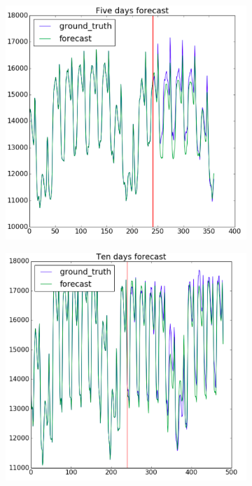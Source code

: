 \documentclass[12pt,fleqn,unicode]{article}
\begin{document}
\begin{figure}[H]
\begin{subfigure}[b]{0.3\textwidth}
    \end{subfigure}
    \begin{subfigure}[b]{0.3\textwidth}
        \includegraphics[width=\textwidth]{fivedays.png}
    \end{subfigure}
    \begin{subfigure}[b]{0.3\textwidth}
        \includegraphics[width=\textwidth]{tendays.png}

\end{subfigure}
\end{figure}
\end{document}

